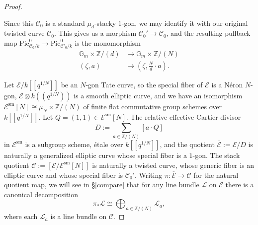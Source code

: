\documentclass[11pt]{amsart}
\theoremstyle{definition}
\begin{document}
\begin{proof}
\begin{center}
\end{center}
Since this ${\mathcal{C}}_0$ is a standard $\mu_d$-stacky $1$-gon, we may identify it with our original twisted curve ${\mathcal{C}}_0$. This gives us a morphism ${\mathcal{C}}_0' \rightarrow {\mathcal{C}}_0$, and the resulting pullback map $\mathrm{Pic}^0_{{\mathcal{C}}_0/k} \rightarrow \mathrm{Pic}^0_{{\mathcal{C}}'_0/k}$ is the monomorphism 
\begin{align*}
\mathbb{G}_m \times \mathbb{Z}/(d) & \rightarrow \mathbb{G}_m \times \mathbb{Z}/(N) \\
(\zeta, a) & \mapsto (\zeta, \frac{N}{d} \cdot a).
\end{align*}

Let ${\mathcal{E}}/k[\![q^{1/N}]\!]$ be an $N$-gon Tate curve, so the special fiber of ${\mathcal{E}}$ is a N\'eron $N$-gon, ${\mathcal{E}} \otimes k((q^{1/N}))$ is a smooth elliptic curve, and we have an isomorphism ${\mathcal{E}}^{\mathrm{sm}}[N] \cong \mu_N \times \mathbb{Z}/(N)$ of finite flat commutative group schemes over $k[\![q^{1/N}]\!]$. Let $Q = (1,1) \in {\mathcal{E}}^{\mathrm{sm}}[N]$. The relative effective Cartier divisor 
\begin{displaymath}
D := \sum_{a \in \mathbb{Z}/(N)} [a\cdot Q]
\end{displaymath}
in ${\mathcal{E}}^{\mathrm{sm}}$ is a subgroup scheme, \'etale over $k[\![q^{1/N}]\!]$, and the quotient $\overline{\mathcal{E}} := {\mathcal{E}}/D$ is naturally a generalized elliptic curve whose special fiber is a $1$-gon. The stack quotient ${\mathcal{C}} := [{\mathcal{E}}/{\mathcal{E}}^{\mathrm{sm}}[N]]$ is naturally a twisted curve, whose generic fiber is an elliptic curve and whose special fiber is ${\mathcal{C}}_0'$. Writing $\pi: \overline{\mathcal{E}} \rightarrow {\mathcal{C}}$ for the natural quotient map, we will see in \S\ref{compare} that for any line bundle ${\mathcal{L}}$ on $\overline{\mathcal{E}}$ there is a canonical decomposition 
\begin{displaymath}
\pi_* {\mathcal{L}} \cong \bigoplus_{a \in \mathbb{Z}/(N)} {\mathcal{L}}_a,
\end{displaymath}
where each ${\mathcal{L}}_a$ is a line bundle on ${\mathcal{C}}$.


\end{proof}
\end{document}
